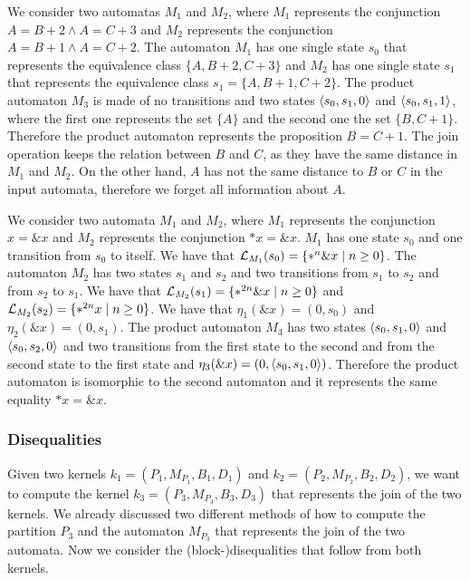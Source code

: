 \begin{example}
    We consider two automatas $M_1$ and $M_2$, where $M_1$ represents the conjunction $A = B + 2 \land A = C + 3$ and $M_2$ represents the conjunction $A = B + 1 \land A = C + 2$.
    The automaton $M_1$ has one single state $s_0$ that represents the equivalence class $\{A, B+2, C+3\}$
    and $M_2$ has one single state $s_1$ that represents the equivalence class $s_1 = \{A, B+1, C+2\}$.
    The product automaton $M_3$ is made of no transitions and two states $\langle s_0, s_1, 0\rangle$ and $\langle s_0, s_1, 1\rangle$, where the first one represents the set $\{A\}$ and the second one the set $\{B, C+1\}$.
    Therefore the product automaton represents the proposition $B = C + 1$.
    The join operation keeps the relation between $B$ and $C$, as they have the same distance in $M_1$ and $M_2$.
    On the other hand, $A$ has not the same distance to $B$ or $C$ in the input automata, therefore we forget all information about $A$.
\end{example}

\begin{example}\label{example:join-subset}
    We consider two automata $M_1$ and $M_2$, where $M_1$ represents the conjunction $x = \&x$ and $M_2$ represents the conjunction $*x = \&x$.
    $M_1$ has one state $s_0$ and one transition from $s_0$ to itself. We have that $\mathcal{L}_{M_1}(s_0) =\{*^n\&x\mid n \geq 0\}$.
    The automaton $M_2$ has two states $s_1$ and $s_2$ and two transitions from $s_1$ to $s_2$ and from $s_2$ to $s_1$. We have that $\mathcal{L}_{M_2}(s_1) = \{*^{2n}\&x\mid n \geq 0\}$ and $\mathcal{L}_{M_2}(s_2) = \{*^{2n}x\mid n \geq 0\}$.
    We have that $\eta_1(\&x) = (0, s_0)$ and $\eta_2 (\&x) = (0, s_1)$.
    The product automaton $M_3$ has two states $\langle s_0, s_1, 0\rangle$ and $\langle s_0, s_2, 0\rangle$ and two transitions from the first state to the second and from the second state to the first state and $\eta_3(\&x) = (0, \langle s_0, s_1, 0\rangle)$.
    Therefore the product automaton is isomorphic to the second automaton and it represents the same equality $*x = \&x$.
\end{example}

\subsubsection{Disequalities}
Given two kernels $k_1 = (P_1, M_{P_1},B_1, D_1)$ and $k_2 = (P_2, M_{P_2},B_2, D_2)$, we want to compute the kernel $k_3 = (P_3, M_{P_3},B_3, D_3)$ that represents the join of the two kernels.
We already discussed two different methods of how to compute the partition $P_3$ and the automaton $M_{P_3}$ that represents the join of the two automata.
Now we consider the (block-)disequalities that follow from both kernels.

